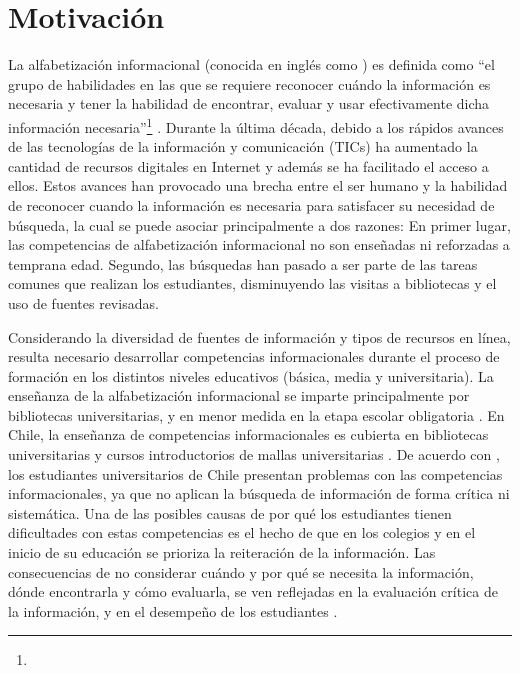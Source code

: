\section{Motivación}
\label{sec:motivacion}
La alfabetización informacional (conocida en inglés como ) es definida como “el grupo de habilidades en las que se requiere reconocer cuándo la información es necesaria y tener la habilidad de encontrar, evaluar y usar efectivamente dicha información necesaria”\footnote{\traduccionlibre} \parencite[p.~2]{american2000information}. Durante la última década, debido a los rápidos avances de las tecnologías de la información y comunicación (TICs) ha aumentado la cantidad de recursos digitales en Internet y además se ha facilitado el acceso a ellos. Estos avances han provocado una brecha entre el ser humano y la habilidad de reconocer cuando la información es necesaria para satisfacer su necesidad de búsqueda, la cual se puede asociar principalmente a dos razones: En primer lugar, las competencias de alfabetización informacional no son enseñadas ni reforzadas a temprana edad. Segundo, las búsquedas  han pasado a ser parte de las tareas comunes que realizan los estudiantes, disminuyendo las visitas a bibliotecas y el uso de fuentes revisadas.

Considerando la diversidad de fuentes de información y tipos de recursos en línea, resulta necesario desarrollar competencias informacionales durante el proceso de formación en los distintos niveles educativos (básica, media y universitaria). La enseñanza de la alfabetización informacional se imparte principalmente por bibliotecas universitarias, y en menor medida en la etapa escolar obligatoria \parencite{weiner2014teaches}. En Chile, la enseñanza de competencias informacionales es cubierta en bibliotecas universitarias y cursos introductorios de mallas universitarias \parencite{marzal2015diagnostico}. De acuerdo con \textcite{urra2016alfabetizacion}, los estudiantes universitarios de Chile presentan problemas con las competencias informacionales, ya que no aplican la búsqueda de información de forma crítica ni sistemática. Una de las posibles causas de por qué los estudiantes tienen dificultades con estas competencias es el hecho de que en los colegios y en el inicio de su educación se prioriza la reiteración de la información. Las consecuencias de no considerar cuándo y por qué se necesita la información, dónde encontrarla y cómo evaluarla, se ven reflejadas en la evaluación crítica de la información, y en el desempeño de los estudiantes \parencite{urra2016alfabetizacion}. 

